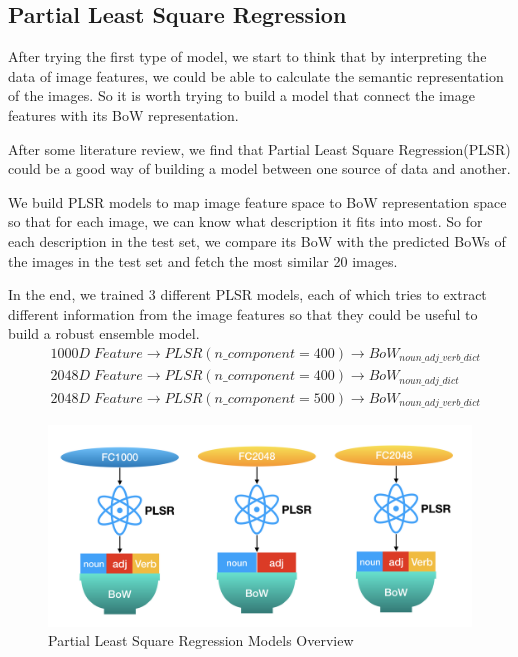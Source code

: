 \documentclass{article}
\begin{document}
\subsection{Partial Least Square Regression}

After trying the first type of model, we start to think that by interpreting the data of image features, we could be able to calculate the semantic representation of the images. So it is worth trying to build a model that connect the image features with its BoW representation.

After some literature review, we find that Partial Least Square Regression(PLSR) could be a good way of building a model between one source of data and another. 

We build PLSR models to map image feature space to BoW representation space so that for each image, we can know what description it fits into most. So for each description in the test set, we compare its BoW with the predicted BoWs of the images in the test set and fetch the most similar 20 images.

In the end, we trained 3 different PLSR models, each of which tries to extract different information from the image features so that they could be useful to build a robust ensemble model.
\begin{equation*}
\begin{aligned}
& 1000D\;Feature \rightarrow PLSR(n\_component = 400) \rightarrow BoW_{noun\_adj\_verb\_dict} \\
& 2048D\;Feature \rightarrow PLSR(n\_component = 400) \rightarrow BoW_{noun\_adj\_dict}  \\
& 2048D\;Feature \rightarrow PLSR(n\_component = 500) \rightarrow BoW_{noun\_adj\_verb\_dict}
\end{aligned}
\end{equation*}

\begin{figure}[h]
  \centering
  \includegraphics[width=\textwidth]{PLSR_models}
  \caption{Partial Least Square Regression Models Overview}
\end{figure}
\end{document}
